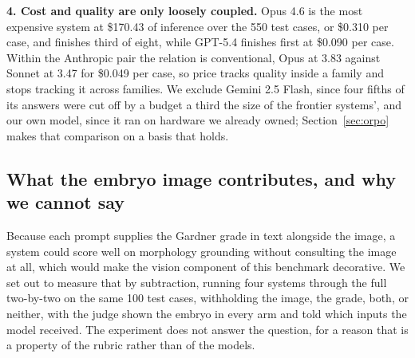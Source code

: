 \textbf{4. Cost and quality are only loosely coupled.} Opus 4.6 is the most
expensive system at \$170.43 of inference over the 550 test cases, or \$0.310 per
case, and finishes third of eight, while GPT-5.4 finishes first at \$0.090 per
case. Within the Anthropic pair the relation is conventional, Opus at 3.83
against Sonnet at 3.47 for \$0.049 per case, so price tracks quality inside a
family and stops tracking it across families. We exclude Gemini 2.5 Flash, since
four fifths of its answers were cut off by a budget a third the size of the
frontier systems', and our own model, since it ran on hardware we already owned;
Section~\ref{sec:orpo} makes that comparison on a basis that holds.

\subsection{What the embryo image contributes, and why we cannot say}
\label{sec:ablation}

Because each prompt supplies the Gardner grade in text alongside the image, a
system could score well on morphology grounding without consulting the image at
all, which would make the vision component of this benchmark decorative. We set
out to measure that by subtraction, running four systems through the full
two-by-two on the same 100 test cases, withholding the image, the grade, both, or
neither, with the judge shown the embryo in every arm and told which inputs the
model received. The experiment does not answer the question, for a reason that is
a property of the rubric rather than of the models.

